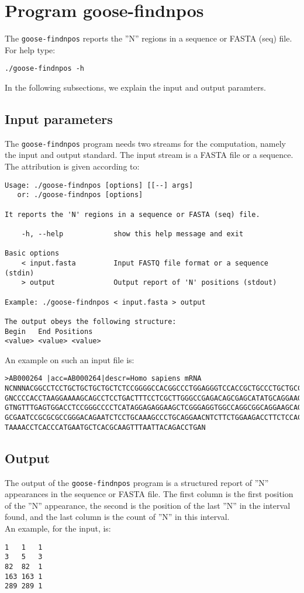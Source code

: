 \section{Program goose-findnpos}
The \texttt{goose-findnpos} reports the ''N'' regions in a sequence or FASTA (seq) file.\\
For help type:
\begin{lstlisting}
./goose-findnpos -h
\end{lstlisting}
In the following subsections, we explain the input and output paramters.

\subsection*{Input parameters}

The \texttt{goose-findnpos} program needs two streams for the computation,
namely the input and output standard. The input stream is a FASTA file or a sequence.\\
The attribution is given according to:
\begin{lstlisting}
Usage: ./goose-findnpos [options] [[--] args]
   or: ./goose-findnpos [options]

It reports the 'N' regions in a sequence or FASTA (seq) file.

    -h, --help            show this help message and exit

Basic options
    < input.fasta         Input FASTQ file format or a sequence (stdin)
    > output              Output report of 'N' positions (stdout)

Example: ./goose-findnpos < input.fasta > output

The output obeys the following structure:
Begin	End	Positions
<value>	<value>	<value>
\end{lstlisting}
An example on such an input file is:
\begin{lstlisting}
>AB000264 |acc=AB000264|descr=Homo sapiens mRNA 
NCNNNACGGCCTCCTGCTGCTGCTGCTCTCCGGGGCCACGGCCCTGGAGGGTCCACCGCTGCCCTGCTGCCATTGTCCCC
GNCCCCACCTAAGGAAAAGCAGCCTCCTGACTTTCCTCGCTTGGGCCGAGACAGCGAGCATATGCAGGAAGCGGCAGGAA
GTNGTTTGAGTGGACCTCCGGGCCCCTCATAGGAGAGGAAGCTCGGGAGGTGGCCAGGCGGCAGGAAGCAGGCCAGTGCC
GCGAATCCGCGCGCCGGGACAGAATCTCCTGCAAAGCCCTGCAGGAACNTCTTCTGGAAGACCTTCTCCACCCCCCCAGC
TAAAACCTCACCCATGAATGCTCACGCAAGTTTAATTACAGACCTGAN
\end{lstlisting}

\subsection*{Output}
The output of the \texttt{goose-findnpos} program is a structured report of ''N'' appearances in the sequence or FASTA file. The first column is the first position of the ''N'' appearance, the second is the position of the last ''N'' in the interval found, and the last column is the count of ''N'' in this interval. \\
An example, for the input, is:
\begin{lstlisting}
1	1	1
3	5	3
82	82	1
163	163	1
289	289	1
\end{lstlisting}
